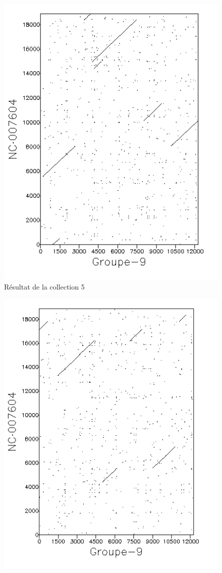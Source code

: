 \begin{figure}[!ht]
	\begin{minipage}[r]{.46\linewidth}
		\begin{center}
		\includegraphics[scale= 0.7]{../res/cible5.png}
		Résultat de la collection 5
	\end{center}
\end{minipage} \hfill
\begin{minipage}[c]{.46 \linewidth}
	\begin{center}
			\includegraphics[scale= 0.7]{../res/cible5-ic.png}

\end{center}
\end{minipage}
\end{figure}
